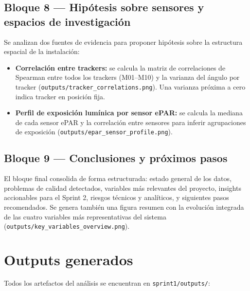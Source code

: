 \documentclass[12pt, a4paper]{article}
\begin{document}
\subsection{Bloque 8 — Hipótesis sobre sensores y espacios de investigación}

Se analizan dos fuentes de evidencia para proponer hipótesis sobre la estructura espacial de la instalación:

\begin{itemize}[leftmargin=1.5cm]
    \item \textbf{Correlación entre trackers:} se calcula la matriz de correlaciones de Spearman entre todos los trackers (M01–M10) y la varianza del ángulo por tracker (\texttt{outputs/tracker\_correlations.png}). Una varianza próxima a cero indica tracker en posición fija.
    \item \textbf{Perfil de exposición lumínica por sensor ePAR:} se calcula la mediana de cada sensor ePAR y la correlación entre sensores para inferir agrupaciones de exposición (\texttt{outputs/epar\_sensor\_profile.png}).
\end{itemize}

\subsection{Bloque 9 — Conclusiones y próximos pasos}

El bloque final consolida de forma estructurada: estado general de los datos, problemas de calidad detectados, variables más relevantes del proyecto, insights accionables para el Sprint 2, riesgos técnicos y analíticos, y siguientes pasos recomendados. Se genera también una figura resumen con la evolución integrada de las cuatro variables más representativas del sistema (\texttt{outputs/key\_variables\_overview.png}).

\section{Outputs generados}

Todos los artefactos del análisis se encuentran en \texttt{sprint1/outputs/}:
\end{document}
